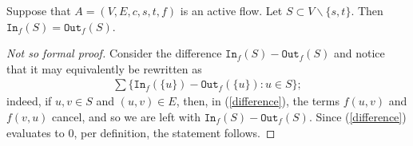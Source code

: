 \documentclass{article}
\begin{document}
\begin{lemma}\label{conservationOfFlow}
    Suppose that $A=(V, E, c, s, t, f)$ is an active flow. Let $S \subset V \backslash \{s, t\}$. Then $\texttt{In}_f(S) = \texttt{Out}_f(S)$.
\end{lemma}
\begin{proof}[Not so formal proof]
    Consider the difference $\texttt{In}_f(S)-\texttt{Out}_f(S)$ and notice that it may equivalently be rewritten as \begin{align}\label{difference}
        \sum \{\texttt{In}_f(\{u\}) - \texttt{Out}_f(\{u\}): u \in S\};
    \end{align}
    indeed, if $u, v \in S$ and $(u, v) \in E$, then, in (\ref{difference}), the terms $f(u, v)$ and $f(v, u)$ cancel, and so we are left with $\texttt{In}_f(S)-\texttt{Out}_f(S)$. Since (\ref{difference}) evaluates to $0$, per definition, the statement follows.
\end{proof}
\end{document}
